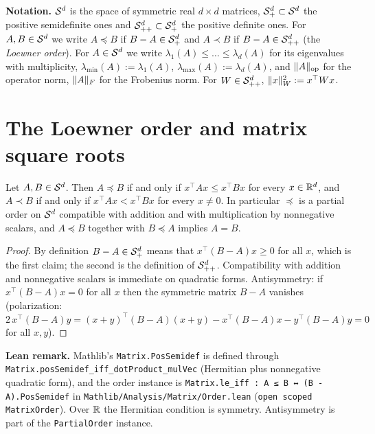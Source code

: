 \textbf{Notation.} $\mathcal{S}^{d}$ is the space of symmetric real $d \times d$ matrices, $\mathcal{S}_{+}^{d} \subset
\mathcal{S}^{d}$ the positive semidefinite ones and $\mathcal{S}_{++}^{d} \subset \mathcal{S}_{+}^{d}$ the positive definite ones. For
$A, B \in \mathcal{S}^{d}$ we write $A \preceq B$ if $B - A \in \mathcal{S}_{+}^{d}$ and $A \prec B$ if $B - A \in \mathcal{S}_{++}^{d}$
(the \emph{Loewner order}). For $A \in \mathcal{S}^{d}$ we write $\lambda_1(A) \le \dots \le \lambda_d(A)$
for its eigenvalues with multiplicity, $\lambda_{\min}(A) := \lambda_1(A)$,
$\lambda_{\max}(A) := \lambda_d(A)$, and $\lVert A \rVert_{\mathrm{op}}$ for the operator norm,
$\lVert A \rVert_F$ for the Frobenius norm. For $W \in \mathcal{S}_{++}^{d}$, $\lVert x \rVert_W^2 := x^\top W x$.

\section{The Loewner order and matrix square roots}
\label{sec:design_loewner}

\begin{lemma}\label{lem:loewner_quadratic}
\leanok
Let $A, B \in \mathcal{S}^{d}$. Then $A \preceq B$ if and only if $x^\top A x \le x^\top B x$ for every
$x \in \mathbb{R}^d$, and $A \prec B$ if and only if $x^\top A x < x^\top B x$ for every $x \ne 0$.
In particular $\preceq$ is a partial order on $\mathcal{S}^{d}$ compatible with addition and with
multiplication by nonnegative scalars, and $A \preceq B$ together with $B \preceq A$ implies
$A = B$.
\end{lemma}

\begin{proof}
\leanok
By definition $B - A \in \mathcal{S}_{+}^{d}$ means that $x^\top(B-A)x \ge 0$ for all $x$, which is the first
claim; the second is the definition of $\mathcal{S}_{++}^{d}$. Compatibility with addition and nonnegative
scalars is immediate on quadratic forms. Antisymmetry: if $x^\top(B-A)x = 0$ for all $x$ then
the symmetric matrix $B - A$ vanishes (polarization: $2\,x^\top(B-A)y = (x+y)^\top(B-A)(x+y) -
x^\top(B-A)x - y^\top(B-A)y = 0$ for all $x, y$).
\end{proof}

\textbf{Lean remark.} Mathlib's \texttt{Matrix.PosSemidef} is defined through
\texttt{Matrix.posSemidef\_iff\_dotProduct\_mulVec} (Hermitian plus nonnegative quadratic form),
and the order instance is \texttt{Matrix.le\_iff : A ≤ B ↔ (B - A).PosSemidef} in
\texttt{Mathlib/Analysis/Matrix/Order.lean} (\texttt{open scoped MatrixOrder}). Over $\mathbb{R}$ the
Hermitian condition is symmetry. Antisymmetry is part of the \texttt{PartialOrder} instance.

